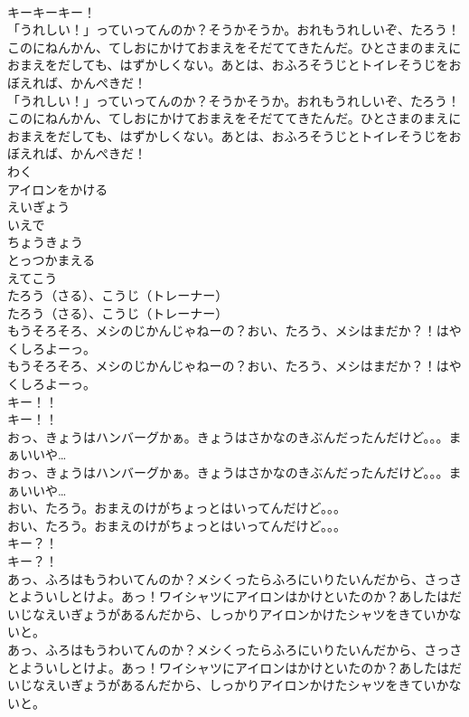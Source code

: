 \documentclass[8pt]{extreport}
\begin{document}
\begin{CJK}{UTF8}{min}
\\	キーキーキー！
\\	「うれしい！」っていってんのか？そうかそうか。おれもうれしいぞ、たろう！このにねんかん、てしおにかけておまえをそだててきたんだ。ひとさまのまえにおまえをだしても、はずかしくない。あとは、おふろそうじとトイレそうじをおぼえれば、かんぺきだ！
\\	「うれしい！」っていってんのか？そうかそうか。おれもうれしいぞ、たろう！このにねんかん、てしおにかけておまえをそだててきたんだ。ひとさまのまえにおまえをだしても、はずかしくない。あとは、おふろそうじとトイレそうじをおぼえれば、かんぺきだ！
\\	わく
\\	アイロンをかける
\\	えいぎょう
\\	いえで
\\	ちょうきょう
\\	とっつかまえる
\\	えてこう
\\	たろう（さる）、こうじ（トレーナー）
\\	たろう（さる）、こうじ（トレーナー）
\\	もうそろそろ、メシのじかんじゃねーの？おい、たろう、メシはまだか？！はやくしろよーっ。
\\	もうそろそろ、メシのじかんじゃねーの？おい、たろう、メシはまだか？！はやくしろよーっ。
\\	キー！！
\\	キー！！
\\	おっ、きょうはハンバーグかぁ。きょうはさかなのきぶんだったんだけど。。。まぁいいや…
\\	おっ、きょうはハンバーグかぁ。きょうはさかなのきぶんだったんだけど。。。まぁいいや…
\\	おい、たろう。おまえのけがちょっとはいってんだけど。。。
\\	おい、たろう。おまえのけがちょっとはいってんだけど。。。
\\	キー？！
\\	キー？！
\\	あっ、ふろはもうわいてんのか？メシくったらふろにいりたいんだから、さっさとよういしとけよ。あっ！ワイシャツにアイロンはかけといたのか？あしたはだいじなえいぎょうがあるんだから、しっかりアイロンかけたシャツをきていかないと。
\\	あっ、ふろはもうわいてんのか？メシくったらふろにいりたいんだから、さっさとよういしとけよ。あっ！ワイシャツにアイロンはかけといたのか？あしたはだいじなえいぎょうがあるんだから、しっかりアイロンかけたシャツをきていかないと。

\end{CJK}
\end{document}
